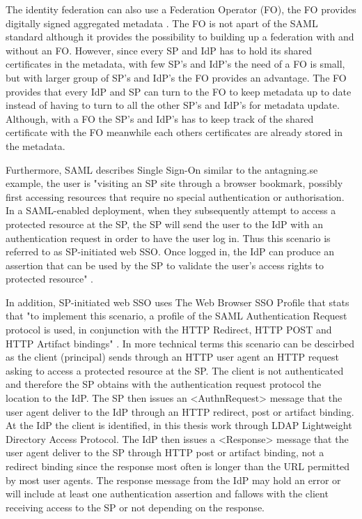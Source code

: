 The identity federation can also use a Federation Operator (FO), the FO provides digitally signed aggregated metadata 
\cite[p.~3]{pdf:Skolfederation}. The FO is not apart of the SAML standard although it provides the possibility to building up 
a federation with and without an FO. However, since every SP and IdP has to hold its shared certificates in the metadata, 
with few SP's and IdP's the need of a FO is small, but with larger group of SP's and IdP's the FO provides an advantage. 
The FO provides that every IdP and SP can turn to the FO to keep metadata up to date instead of having to turn to all 
the other SP's and IdP's for metadata update. Although, with a FO the SP's and IdP's has to keep track of the shared 
certificate with the FO meanwhile each others certificates are already stored in the metadata.

Furthermore, SAML describes Single Sign-On similar to the antagning.se example, the user is "visiting an SP site through 
a browser bookmark, possibly first accessing resources that require no special authentication or authorisation. 
In a SAML-enabled deployment, when they subsequently attempt to access a protected resource at the SP, the SP will send 
the user to the IdP with an authentication request in order to have the user log in. 
Thus this scenario is referred to as SP-initiated web SSO. Once logged in, the IdP can produce an assertion that 
can be used by the SP to validate the user's access rights to protected resource" \cite[p.~12]{pdf:oasis-open}. 

In addition, SP-initiated web SSO uses The Web Browser SSO Profile that stats that "to implement this scenario, 
a profile of the SAML Authentication Request protocol is used, in conjunction with the HTTP Redirect, HTTP POST and 
HTTP Artifact bindings" \cite[p.~14]{pdf:oasis-open-profiles}. 
In more technical terms this scenario can be descirbed as the client (principal) sends through an HTTP user agent 
an HTTP request asking to access a protected resource at the SP. The client is not authenticated and therefore the SP 
obtains with the authentication request protocol the location to the IdP. The SP then issues an <AuthnRequest> message 
that the user agent deliver to the IdP through an HTTP redirect, post or artifact binding. 
At the IdP the client is identified, in this thesis work through LDAP Lightweight Directory Access Protocol. 
The IdP then issues a <Response> message that the user agent deliver to the SP through HTTP post or artifact binding, 
not a redirect binding since the response most often is longer than the URL permitted by most user agents. 
The response message from the IdP may hold an error or will include at least one authentication assertion and fallows 
with the client receiving access to the SP or not depending on the response. \cite[p.~15]{pdf:oasis-open-profiles}

